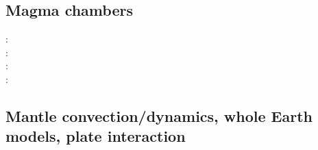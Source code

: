 \subsection{Magma chambers}

\begin{scriptsize}
\nineteeneightytwo: \cite{spyk82}\\
\twothousandtwelve: \cite{gerb12}\cite{gech12}\\
\twothousandfourteen: \cite{cuwi14}\\
\twothousandeighteen: \cite{gehn18}
\end{scriptsize}

\subsection{Mantle convection/dynamics, whole Earth models, plate interaction}

